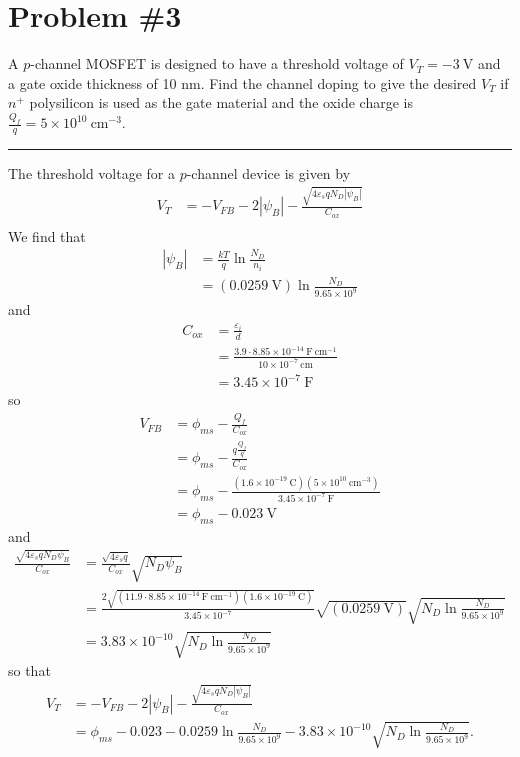 \documentclass{article}
\newcommand{\horline}
           {\begin{center}
              \noindent\rule{8cm}{0.4pt}
            \end{center}}
\begin{document}
\section*{Problem \#3}
A $p$-channel MOSFET is designed to have a threshold voltage of 
$V_T = -3 ~\mathrm{V}$ and a gate oxide thickness of 10 nm. Find the channel
doping to give the desired $V_T$ if $n^+$ polysilicon is used as the gate
material and the oxide charge is 
$\frac{Q_f}{q} = 5 \times 10^{10} ~\mathrm{cm}^{-3}$.
\horline
The threshold voltage for a $p$-channel device is given by
\begin{align*}
V_{T} &= -V_{FB} - 2|\psi_B| - \frac{\sqrt{4\varepsilon_s q N_D |\psi_B|}}{C_{ox}} \\
\end{align*}
We find that
\begin{align*}
|\psi_B| &= \frac{kT}{q} \ln \frac{N_D}{n_i} \\
         &= (0.0259 ~\mathrm{V})\ln \frac{N_D}{9.65 \times 10^{9}}
\end{align*}
and
\begin{align*}
C_{ox} &= \frac{\varepsilon_i}{d} \\
       &= \frac{3.9 \cdot 8.85 \times 10^{-14} ~\mathrm{F}~\mathrm{cm^{-1}}}
               {10 \times 10^{-7} ~\mathrm{cm}} \\
       &= 3.45 \times 10^{-7} ~\mathrm{F}
\end{align*}
so
\begin{align*}
V_{FB} &= \phi_{ms} - \frac{Q_f}{C_{ox}} \\
       &= \phi_{ms} - \frac{q\frac{Q_f}{q}}{C_{ox}} \\
       &= \phi_{ms} - \frac{(1.6 \times 10^{-19} ~\mathrm{C})
                            (5 \times 10^{10} ~\mathrm{cm}^{-3})}
                           {3.45 \times 10^{-7} ~\mathrm{F}} \\
       &= \phi_{ms} - 0.023 ~\mathrm{V}
\end{align*}
and
\begin{align*}
\frac{\sqrt{4 \varepsilon_s q N_D \psi_B}}{C_{ox}}
  &= \frac{\sqrt{4 \varepsilon_s q}}{C_{ox}} \sqrt{N_D \psi_B} \\
  &= \frac{2\sqrt{(11.9 \cdot 8.85 \times 10^{-14} ~\mathrm{F}~\mathrm{cm}^{-1})
                  (1.6 \times 10^{-19} ~\mathrm{C})}}
          {3.45 \times 10^{-7}} 
     \sqrt{(0.0259 ~\mathrm{V})} 
     \sqrt{N_D \ln \frac{N_D}{9.65 \times 10^9}} \\
  &= 3.83 \times 10^{-10} \sqrt{N_D \ln \frac{N_D}{9.65 \times 10^9}}
\end{align*}
so that
\begin{align*}
V_{T} &= -V_{FB} - 2|\psi_B| - \frac{\sqrt{4\varepsilon_s q N_D |\psi_B|}}{C_{ox}} \\
      &= \phi_{ms} - 0.023 
         - 0.0259\ln\frac{N_D}{9.65 \times 10^9} 
         - 3.83 \times 10^{-10} \sqrt{N_D \ln \frac{N_D}{9.65 \times 10^9}}.
\end{align*}
\end{document}
